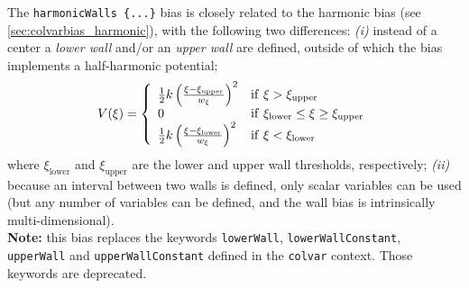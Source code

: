 The \texttt{harmonicWalls~\{...\}} bias is closely related to the harmonic bias (see \ref{sec:colvarbias_harmonic}), with the following two differences: \emph{(i)} instead of a center a \emph{lower wall} and/or an \emph{upper wall} are defined, outside of which the bias implements a half-harmonic potential;
\begin{equation}
  \label{eq:colvarbias_harmonic_walls}
  V(\xi) = \left\{
    \begin{array}{l l}
      \frac{1}{2} k \left(\frac{\xi - \xi_{\mathrm{upper}}}{w_{\xi}}\right)^2 & \mathrm{if }\ \xi > \xi_{\mathrm{upper}} \\
      0 & \mathrm{if }\ \xi_{\mathrm{lower}} \leq \xi \geq \xi_{\mathrm{upper}} \\
      \frac{1}{2} k \left(\frac{\xi - \xi_{\mathrm{lower}}}{w_{\xi}}\right)^2 & \mathrm{if }\ \xi < \xi_{\mathrm{lower}}
    \end{array}
  \right.
\end{equation}
where $\xi_{\mathrm{lower}}$ and $\xi_{\mathrm{upper}}$ are the lower and upper wall thresholds, respectively; \emph{(ii)} because an interval between two walls is defined, only scalar variables can be used (but any number of variables can be defined, and the wall bias is intrinsically multi-dimensional).\\

\textbf{Note:} this bias replaces the keywords \texttt{lowerWall}, \texttt{lowerWallConstant}, \texttt{upperWall} and \texttt{upperWallConstant} defined in the \texttt{colvar} context.
Those keywords are deprecated.

